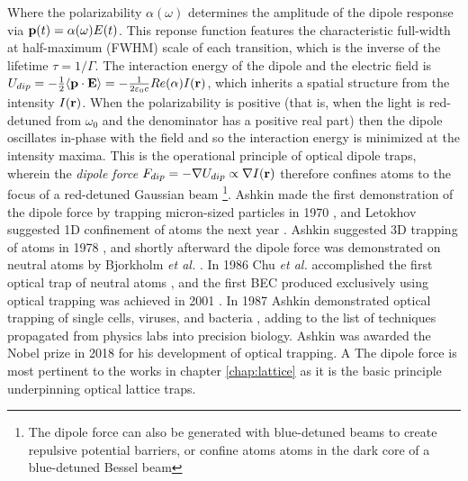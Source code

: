 	Where the polarizability $\alpha(\omega)$ determines the amplitude of the dipole response via $\textbf{p}(t) = \alpha(\omega)E(t)$. This reponse function features the characteristic full-width at half-maximum (FWHM) scale of each transition, which is the inverse of the lifetime $\tau=1/\Gamma$. The interaction energy of the dipole and the electric field is $U_{dip} = -\frac{1}{2}\langle\textbf{p}\cdot\textbf{E}\rangle = -\frac{1}{2\varepsilon_0 c}Re(\alpha)I(\textbf{r})$, which inherits a spatial structure from the intensity $I(\textbf{r})$. When the polarizability is positive (that is, when the light is red-detuned from $\omega_0$ and the denominator has a positive real part) then the dipole oscillates in-phase with the field and so the interaction energy is minimized at the intensity maxima. This is the operational principle of optical dipole traps, wherein the \emph{dipole force} $F_{dip} = -\nabla U_{dip} \propto \nabla I(\textbf{r})$ therefore confines atoms to the focus of a red-detuned Gaussian beam \footnote{The dipole force can also be generated with blue-detuned beams to create repulsive potential barriers, or confine atoms atoms in the dark core of a blue-detuned Bessel beam}. Ashkin made the first demonstration of the dipole force by trapping micron-sized particles in 1970 \cite{ashkin70}, and Letokhov suggested 1D confinement of atoms the next year \cite{}. Ashkin suggested 3D trapping of atoms in 1978 \cite{ashkin78}, and shortly afterward the dipole force was demonstrated on neutral atoms by Bjorkholm \emph{et al.} \cite{}. In 1986 Chu \emph{et al.} accomplished the first optical trap of neutral atoms \cite{chu86}, and the first BEC produced exclusively using optical trapping was achieved in 2001 \cite{barrett01}. In 1987 Ashkin demonstrated optical trapping of single cells, viruses, and bacteria \cite{ashkin87cell, ashkin87virus}, adding to the list of techniques propagated from physics labs into precision biology. Ashkin was awarded the Nobel prize in 2018 for his development of optical trapping. A The dipole force is most pertinent to the works in chapter \ref{chap:lattice} as it is the basic principle underpinning optical lattice traps. 


